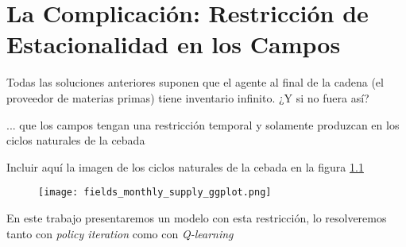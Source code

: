 \chapter{La Complicaci\'on: Restricci\'on de Estacionalidad en los Campos}

Todas las soluciones anteriores suponen que el agente al final de la cadena (el proveedor de materias primas) tiene inventario infinito. ¿Y si no fuera as\'i?

... que los campos tengan una restricci\'on temporal y solamente produzcan en los ciclos naturales de la cebada

Incluir aqu\'i la imagen de los ciclos naturales de la cebada en la figura \ref{fields}

\begin{figure}[h]
\caption{ }
\label{fields}
\texttt{[image: fields\_monthly\_supply\_ggplot.png]}
\centering
\end{figure}


En este trabajo presentaremos un modelo con esta restricci\'on, lo resolveremos tanto con \textit{policy iteration} como con \textit{Q-learning}
